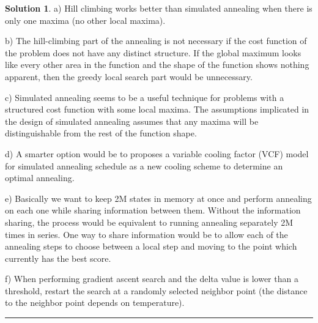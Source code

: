 \documentclass{article}
\theoremstyle{definition}
\def\fline{\rule{0.75\linewidth}{0.5pt}}
\newcommand{\finishline}{\begin{center}\fline\end{center}}
\newtheorem*{solution*}{Solution}
\newenvironment{solution}{\begin{solution*}}{{\finishline} \end{solution*}}
\begin{document}
\begin{solution}
	\item a) Hill climbing works better than simulated annealing when there is only one maxima (no other local maxima).
	\item b) The hill-climbing part of the annealing is not necessary if the cost function of the problem does not have any distinct structure. If the global maximum looks like every other area in the function and the shape of the function shows nothing apparent, then the greedy local search part would be unnecessary.
	\item c) Simulated annealing seems to be a useful technique for problems with a structured cost function with some local maxima. The assumptions implicated in the design of simulated annealing assumes that any maxima will be distinguishable from the rest of the function shape.
	\item d) A smarter option would be to proposes a variable cooling factor (VCF) model for simulated annealing schedule as a new cooling scheme to determine an optimal annealing. 
	\item e) Basically we want to keep 2M states in memory at once and perform annealing on each one while sharing information between them. Without the information sharing, the process would be equivalent to running annealing separately 2M times in series. One way to share information would be to allow each of the annealing steps to choose between a local step and moving to the point which currently has the best score.
	\item f) When performing gradient ascent search and the delta value is lower than a threshold, restart the search at a randomly selected neighbor point (the distance to the neighbor point depends on temperature). 

\end{solution}
\end{document}
